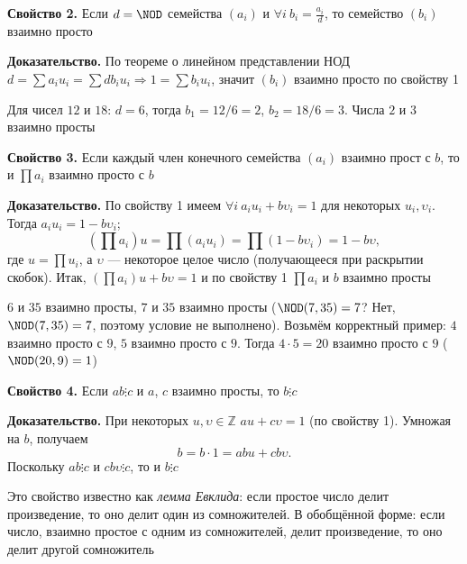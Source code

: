 \documentclass[a4paper,12pt]{article}
\theoremstyle{definition}
\theoremstyle{plain}
\theoremstyle{remark}
\begin{document}
	\medskip
	\noindent \textbf{Свойство 2.}
	Если $d = \NOD$ семейства $(a_i)$ и $\forall i \ b_i = \frac{a_i}{d}$, то семейство $(b_i)$ взаимно просто
	
	\medskip
	\noindent \textbf{Доказательство.}
	По теореме о линейном представлении НОД $d = \sum a_i u_i = \sum d b_i u_i \Rightarrow 1 = \sum b_i u_i$, значит $(b_i)$ взаимно просто по свойству 1
	
	\begin{tcolorbox}[colback=gray!5, colframe=gray!50, title=Пример]
	Для чисел $12$ и $18$: $d = 6$, тогда $b_1 = 12/6 = 2$, $b_2 = 18/6 = 3$. Числа $2$ и $3$ взаимно просты
	\end{tcolorbox}
	
	\medskip
	\noindent \textbf{Свойство 3.}
	Если каждый член конечного семейства $(a_i)$ взаимно прост с $b$, то и $\prod a_i$ взаимно просто с $b$
	
	\medskip
	\noindent \textbf{Доказательство.}
	По свойству 1 имеем $\forall i \ a_i u_i + b \upsilon_i = 1$ для некоторых $u_i, \upsilon_i$. Тогда $a_i u_i = 1 - b \upsilon_i$;
	\[
	(\prod a_i) u = \prod (a_i u_i) = \prod (1 - b \upsilon_i) = 1 - b \upsilon,
	\]
	где $u = \prod u_i$, а $\upsilon$ — некоторое целое число (получающееся при раскрытии скобок). Итак, $(\prod a_i) u + b \upsilon = 1$ и по свойству 1 $\prod a_i$ и $b$ взаимно просты
	
	\begin{tcolorbox}[colback=blue!5, colframe=blue!40!black, title=Пример]
	$6$ и $35$ взаимно просты, $7$ и $35$ взаимно просты ($\NOD(7,35)=7$? Нет, $\NOD(7,35)=7$, поэтому условие не выполнено). 
	Возьмём корректный пример: $4$ взаимно просто с $9$, $5$ взаимно просто с $9$. Тогда $4 \cdot 5 = 20$ взаимно просто с $9$ ($\NOD(20,9)=1$)
	\end{tcolorbox}
	
	\medskip
	\noindent \textbf{Свойство 4.}
	Если $ab \vdots c$ и $a$, $c$ взаимно просты, то $b \vdots c$
	
	\medskip
	\noindent \textbf{Доказательство.}
	При некоторых $u, \upsilon \in \mathbb{Z}$ $au + c\upsilon = 1$ (по свойству 1). Умножая на $b$, получаем
	\[
	b = b \cdot 1 = abu + cb\upsilon.
	\]
	Поскольку $ab \vdots c$ и $cb\upsilon \vdots c$, то и $b \vdots c$
	
	\begin{tcolorbox}[colback=red!5, colframe=red!70!black, title=Лемма Евклида]
	Это свойство известно как \textit{лемма Евклида}: если простое число делит произведение, то оно делит один из сомножителей. В обобщённой форме: если число, взаимно простое с одним из сомножителей, делит произведение, то оно делит другой сомножитель
	\end{tcolorbox}
	
\end{document}
